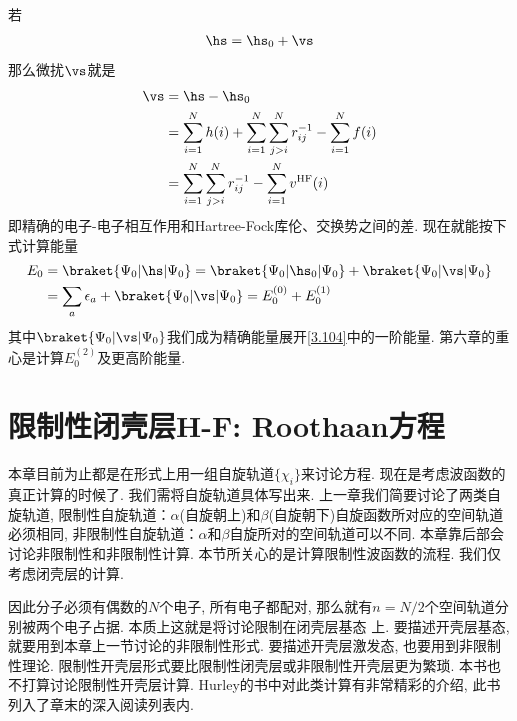 若
\begin{align}\label{3.107}
	\hs = \hs_0 + \vs
\end{align}
那么微扰$\vs$就是
\begin{align}
	\vs & = \hs -\hs_0\notag\\
	& = \sum_{i=1}^{N}h(i) + \sum_{i=1}^{N}\sum_{j>i}^{N}r_{ij}^{-1} - \sum_{i=1}^{N}f(i)\notag\\
	& = \sum_{i=1}^{N}\sum_{j>i}^{N}r_{ij}^{-1} - \sum_{i=1}^{N}v^\mathrm{HF}(i)
	\label{3.108}
\end{align}
即精确的电子-电子相互作用和Hartree-Fock库伦、交换势之间的差. 
现在就能按下式计算\hft 能量
\begin{align}\label{3.109}
	E_0 & = \braket{\Psi_0|\hs|\Psi_0} = \braket{\Psi_0|\hs_0|\Psi_0} + \braket{\Psi_0|\vs|\Psi_0} \notag\\
	& = \sum_a\epsilon_a + \braket{\Psi_0|\vs|\Psi_0} = E_0^{(0)} + E_0^{(1)}
\end{align}
其中$\braket{\Psi_0|\vs|\Psi_0}$我们成为精确能量展开\autoref{3.104}中的一阶能量. 
第六章的重心是计算$E_0^{(2)}$及更高阶能量.

\section{限制性闭壳层H-F: Roothaan方程}
本章目前为止都是在形式上用一组自旋轨道$\{\chi_i\}$来讨论\hft 方程. 
现在是考虑\hft 波函数的真正计算的时候了. 
我们需将自旋轨道具体写出来. 
上一章我们简要讨论了两类自旋轨道, 
限制性自旋轨道：$\alpha$(自旋朝上)和$\beta$(自旋朝下)自旋函数所对应的空间轨道必须相同, 
非限制性自旋轨道：$\alpha$和$\beta$自旋所对的空间轨道可以不同. 
本章靠后部会讨论非限制性\hft 和非限制性\hft 计算. 
本节所关心的是计算限制性\hft 波函数的流程. 
我们仅考虑闭壳层的计算.

因此分子必须有偶数的$N$个电子, 所有电子都配对, 那么就有$n=N/2$个空间轨道分别被两个电子占据. 本质上这就是将讨论限制在闭壳层基态
上. 
要描述开壳层基态, 就要用到本章上一节讨论的非限制性形式. 
要描述开壳层激发态, 也要用到非限制性\hft 理论. 
限制性开壳层形式要比限制性闭壳层或非限制性开壳层更为繁琐. 
本书也不打算讨论限制性开壳层\hft 计算. 
Hurley的书中对此类计算有非常精彩的介绍, 此书列入了章末的深入阅读列表内.
